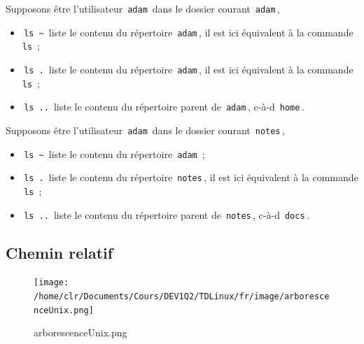 \documentclass[11pt,a4paper]{article}
\begin{document}
          Supposons \^etre l'utilisateur \,\verb|adam|\, dans le dossier courant \,\verb|adam|\,, 
          
					\begin{itemize}
				
			\item \,\verb|ls ~|\, liste le contenu du r\'epertoire \,\verb|adam|\,, 
			        il est ici \'equivalent \`a la commande \,\verb|ls|\,  ;
            
			\item \,\verb|ls .|\, liste le contenu du r\'epertoire \,\verb|adam|\,, 
			        il est ici \'equivalent \`a la commande \,\verb|ls|\,  ;
            
			\item \,\verb|ls ..|\, liste le contenu du r\'epertoire parent de \,\verb|adam|\,, 
			        c-\`a-d \,\verb|home|\,.
            
					\end{itemize}
				
            \par
        
          Supposons \^etre l'utilisateur \,\verb|adam|\, dans le dossier courant \,\verb|notes|\,, 
          
					\begin{itemize}
				
			\item \,\verb|ls ~|\, liste le contenu du r\'epertoire \,\verb|adam|\, ;
            
			\item \,\verb|ls .|\, liste le contenu du r\'epertoire \,\verb|notes|\,, 
			        il est ici \'equivalent \`a la commande \,\verb|ls|\,  ;
            
			\item \,\verb|ls ..|\, liste le contenu du r\'epertoire parent de \,\verb|notes|\,, 
			        c-\`a-d \,\verb|docs|\,.
            
					\end{itemize}
				
            \par
        \subsection{Chemin relatif}\begin{figure}[hbt]
				    \begin{center}
					\texttt{[image: /home/clr/Documents/Cours/DEV1Q2/TDLinux/fr/image/arborescenceUnix.png]}
						\end{center}
                
                    \caption[arborescenceUnix.png]{arborescenceUnix.png}
                \end{figure}
                    
\end{document}
